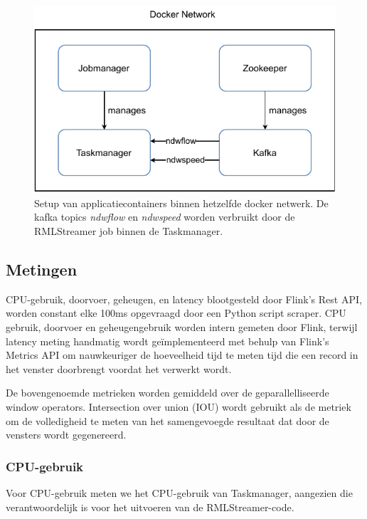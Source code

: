 \begin{figure}[htpb]
    \centering
    \includegraphics[width=\columnwidth]{fig/docker_setup.pdf}
    \caption[Setup of application containers inside the same docker network.]{ 
Setup van applicatiecontainers binnen hetzelfde docker netwerk.
De kafka topics \emph{ndwflow} en \emph{ndwspeed} worden verbruikt door de 
RMLStreamer job binnen de Taskmanager.}
    \label{fig:docker_setup}
\end{figure}

\subsection{Metingen}%
\label{sub:Metrics measurement}

CPU-gebruik, doorvoer, geheugen, en latency blootgesteld 
door Flink's Rest API, worden constant elke 100ms opgevraagd door een 
Python script scraper.
CPU gebruik, doorvoer 
en geheugengebruik worden intern gemeten door Flink,
terwijl latency meting 
handmatig wordt geïmplementeerd met behulp van Flink's Metrics API om nauwkeuriger de hoeveelheid tijd te meten 
tijd die een record in het venster doorbrengt voordat het verwerkt wordt. 

De bovengenoemde metrieken worden gemiddeld over de geparallelliseerde window operators.
Intersection over union (IOU) wordt gebruikt als de metriek om de volledigheid te meten
van het samengevoegde resultaat dat door de vensters wordt gegenereerd.  


\subsubsection{CPU-gebruik}%
\label{ssub:CPU usage}
Voor CPU-gebruik meten we het CPU-gebruik van Taskmanager, aangezien die 
verantwoordelijk is voor het uitvoeren van de RMLStreamer-code. 

